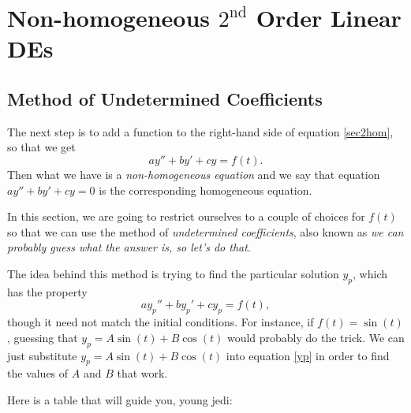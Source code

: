 \documentclass[10pt,driverfallback=hypertex]{report}
\begin{document}
\chapter{Non-homogeneous $2^{\text{nd}}$ Order Linear DEs}
\newpage

\section{Method of Undetermined Coefficients}
The next step is to add a function to the right-hand side of equation
\eqref{sec2hom}, so that we get
\begin{dmath*}
  a y'' + b y' + cy =f(t).
\end{dmath*}
Then what we have is a \emph{non-homogeneous equation} and we say that
equation $a y'' + b y' + cy =0$ is the corresponding homogeneous
equation.

In this section, we are going to restrict ourselves to a couple of
choices for $f(t)$ so that we can use the method of \emph{undetermined
  coefficients}, also known as \emph{we can probably guess what the
  answer is, so let's do that}.

The idea behind this method is trying to find the particular solution $y_p$,
which has the property
\begin{dmath} 
  \label{yp}
  a y_p'' + b y_p' + cy_p =f(t),
\end{dmath}
though it need not match the initial conditions. For instance, if
$f(t)=\sin(t)$, guessing that $y_p = A \sin(t) + B \cos(t)$ would probably do
the trick. We can just substitute $y_p = A \sin(t) + B \cos(t)$ into equation
\eqref{yp} in order to find the values of $A$ and $B$ that work.

Here is a table that will guide you, young jedi:
\end{document}
